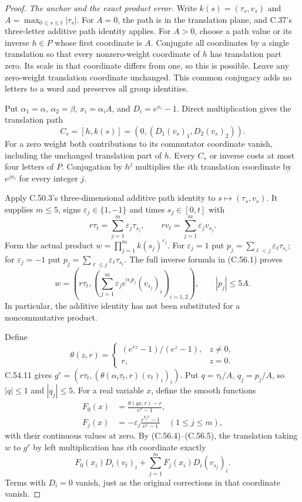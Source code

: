 \begin{proof}
\emph{The anchor and the exact product error.}
Write $k(s)=(\tau_s,v_s)$ and
$A=\max_{0\leq s\leq t}|\tau_s|$.
For $A=0$, the path is in the translation plane,
and C.37's three-letter additive path identity applies.
For $A>0$, choose a path value or its inverse
$h\in P$ whose first coordinate is $A$.
Conjugate all coordinates by a single translation
so that every nonzero-weight coordinate of $h$
has translation part zero. Its scale in that
coordinate differs from one, so this is possible.
Leave any zero-weight translation coordinate
unchanged. This common conjugacy adds no letters
to a word and preserves all group identities.

Put $\alpha_1=\alpha$, $\alpha_2=\beta$,
$x_i=\alpha_i A$, and $D_i=e^{x_i}-1$.
Direct multiplication gives the translation path
\[
 C_s=[h,k(s)]=(0,(D_1(v_s)_1,D_2(v_s)_2)).               \tag{C.56.3}
\]
For a zero weight both contributions to its
commutator coordinate vanish, including the
unchanged translation part of $h$.
Every $C_s$ or inverse costs at most four letters
of $P$. Conjugation by $h^j$ multiplies the
$i$th translation coordinate by $e^{jx_i}$
for every integer $j$.

Apply C.50.3's three-dimensional additive path
identity to $s\mapsto(\tau_s,v_s)$. It supplies
$m\leq5$, signs $\varepsilon_j\in\{1,-1\}$ and
times $s_j\in[0,t]$ with
\[
 r\tau_t=\sum_{j=1}^{m}\varepsilon_j\tau_{s_j},
 \qquad rv_t=\sum_{j=1}^{m}\varepsilon_jv_{s_j}.
                                                        \tag{C.56.4}
\]
Form the actual product $w=\prod_{j=1}^{m}k(s_j)^{\varepsilon_j}$.
For $\varepsilon_j=1$ put
$p_j=\sum_{\ell<j}\varepsilon_\ell\tau_{s_\ell}$;
for $\varepsilon_j=-1$ put
$p_j=\sum_{\ell\leq j}\varepsilon_\ell\tau_{s_\ell}$.
The full inverse formula in (C.56.1) proves
\[
 w=\left(r\tau_t,
       \left(\sum_{j=1}^{m}\varepsilon_j
           e^{\alpha_i p_j}(v_{s_j})_i\right)_{i=1,2}\right),
              \qquad |p_j|\leq5A.                     \tag{C.56.5}
\]
In particular, the additive identity has not
been substituted for a noncommutative product.

Define
\[
 \theta(z,r)=
 \begin{cases}(e^{rz}-1)/(e^z-1),&z\ne0,\\r,&z=0.\end{cases}
                                                        \tag{C.56.6}
\]
C.54.11 gives
$g^r=(r\tau_t,(\theta(\alpha_i\tau_t,r)(v_t)_i)_i)$.
Put $q=\tau_t/A$, $q_j=p_j/A$, so $|q|\leq1$ and
$|q_j|\leq5$. For a real variable $x$, define the
smooth functions
\[
 \begin{split}
 F_0(x)&=\frac{\theta(qx,r)-r}{e^x-1},\\
 F_j(x)&=-\varepsilon_j\frac{e^{q_jx}-1}{e^x-1}
                                      \quad(1\leq j\leq m),
 \end{split}                                            \tag{C.56.7}
\]
with their continuous values at zero.
By (C.56.4)--(C.56.5), the translation taking
$w$ to $g^r$ by left multiplication has
$i$th coordinate exactly
\[
 F_0(x_i)D_i(v_t)_i+
          \sum_{j=1}^{m}F_j(x_i)D_i(v_{s_j})_i.          \tag{C.56.8}
\]
Terms with $D_i=0$ vanish, just as the original
corrections in that coordinate vanish.


\end{proof}
